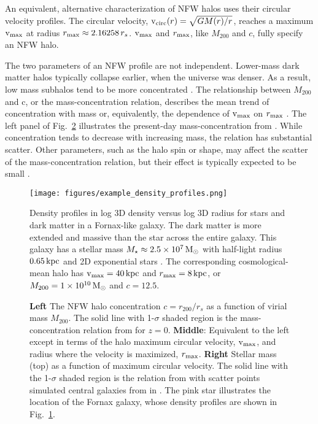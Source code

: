An equivalent, alternative characterization of NFW halos uses their
circular velocity profiles. The circular velocity,
\({\rm v}_{\rm circ}(r) = \sqrt{G M(r) / r}\), reaches a maximum \({\rm v}_{\rm max}\) at radius
\(r_{\rm max} \approx 2.16258\,r_s\). \({\rm v}_{\rm max}\) and \(r_{\rm max}\), like
\(M_{200}\) and \(c\), fully specify an NFW halo.

The two parameters of an NFW profile are not independent. Lower-mass
dark matter halos typically collapse earlier, when the universe was
denser. As a result, low mass subhalos tend to be more concentrated
\citep[e.g.,][]{NFW1997}. The relationship between \(M_{200}\) and c, or
the mass-concentration relation, describes the mean trend of
concentration with mass or, equivalently, the dependence of \({\rm v}_{\rm max}\) on
\(r_{\rm max}\) \citep[e.g.,][]{bullock+2001, ludlow+2014}. The left panel of
Fig.~\ref{fig:smhm} illustrates the present-day mass-concentration from
\citet{ludlow+2016}. While concentration tends to decrease with
increasing mass, the relation has substantial scatter. Other parameters,
such as the halo spin or shape, may affect the scatter of the
mass-concentration relation, but their effect is typically expected to
be small \citep{navarro+2010, dicintio+2013, dutton+maccio2014}.

\begin{figure}
\centering
\texttt{[image: figures/example\_density\_profiles.png]}
\caption[Example dark matter and stellar density profiles]{Density
profiles in log 3D density versus log 3D radius for stars and dark
matter in a Fornax-like galaxy. The dark matter is more extended and
massive than the star across the entire galaxy. This galaxy has a
stellar mass \(M_\star \approx 2.5\times10^7\,{\rm M}_{\odot}\) with half-light
radius \(0.65\,{\rm kpc}\) and 2D exponential stars \citep[based
on,][]{munoz+2018, woo+courteau+dekel2008}. The corresponding
cosmological-mean halo has \({\rm v}_{\rm max}=40\,{\rm kpc}\) and \(r_{\rm max}=8\,{\rm kpc}\), or
\(M_{200} = 1\times10^{10}\,{\rm M}_{\odot}\) and
\(c=12.5\).}\label{fig:nfw_density}
\end{figure}

\begin{figure}
\centering
{}
\caption[Cosmological mass-concentration and stellar mass-halo mass
relations]{\textbf{Left} The NFW halo concentration \(c=r_{200} / r_s\)
as a function of virial mass \(M_{200}\). The solid line with
1-\(\sigma\) shaded region is the mass-concentration relation from
\citet{ludlow+2016} for \(z=0\). \textbf{Middle}: Equivalent to the left
except in terms of the halo maximum circular velocity, \({\rm v}_{\rm max}\), and
radius where the velocity is maximized, \(r_{\rm max}\). \textbf{Right}
Stellar mass (top) as a function of maximum circular velocity. The solid
line with the 1-\(\sigma\) shaded region is the relation from
\citet{fattahi+2018} with scatter points simulated central galaxies from
\apostle{} in \citet{fattahi+2018}. The pink star illustrates the
location of the Fornax galaxy, whose density profiles are shown in
Fig.~\ref{fig:nfw_density}.}\label{fig:smhm}
\end{figure}

